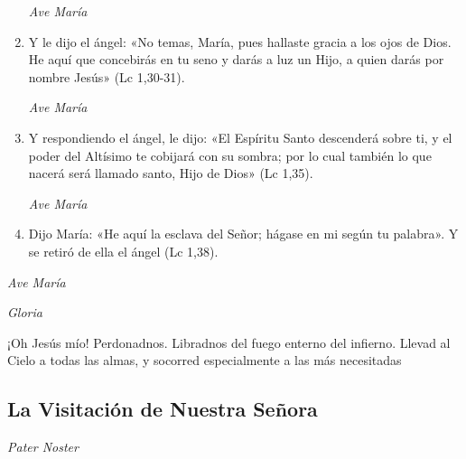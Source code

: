 \documentclass[a4paper,11pt, oneside]{report}
\begin{document}
\begin{enumerate}
          \textit{Ave María}

          \item Y le dijo el ángel: «No temas, María, pues hallaste gracia a los ojos de Dios. He aquí que concebirás en tu seno y darás a luz un Hijo,
          a quien darás por nombre Jesús» (Lc 1,30-31).

          \textit{Ave María}

          \item Y respondiendo el ángel, le dijo: «El Espíritu Santo descenderá sobre ti, y el poder del Altísimo te cobijará con su sombra; por lo cual
          también lo que nacerá será llamado santo, Hijo de Dios» (Lc 1,35).

          \textit{Ave María}

          \item Dijo María: «He aquí la esclava del Señor; hágase en mi según tu palabra». Y se retiró de ella el ángel (Lc 1,38).
          
        \end{enumerate}

        \textit{Ave María} \par
        \indent\textit{Gloria} \par
        \indent¡Oh Jesús mío! Perdonadnos. Libradnos del fuego enterno del infierno. Llevad al Cielo a todas las almas, y socorred especialmente a las más 
        necesitadas
            
      \subsection*{La Visitación de Nuestra Señora}
      
        \textit{Pater Noster} 
\end{document}
